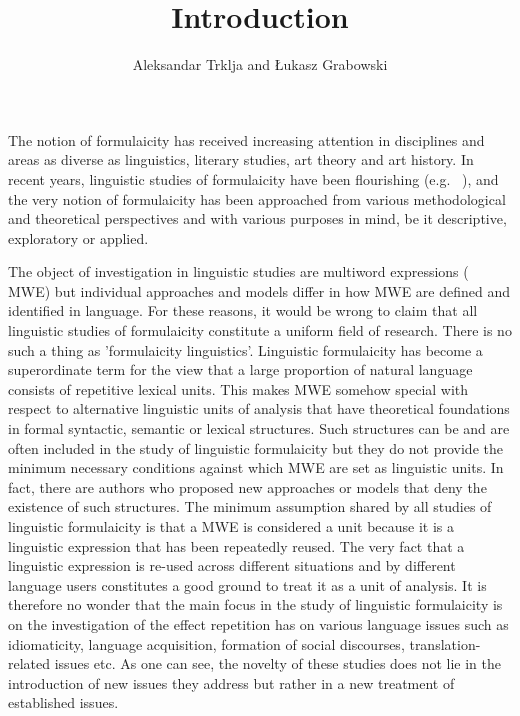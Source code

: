 \documentclass[output=paper]{langsci/langscibook}
\author{Aleksandar Trklja\orcid{}\affiliation{Universität Innsbruck} and Łukasz Grabowski\orcid{}\affiliation{University of Opole}}
\title{Introduction}
\begin{document}
\maketitle 

 



The notion of formulaicity has received increasing attention in disciplines and areas as diverse as  linguistics, literary studies, art theory and art history. In recent years, linguistic studies of formulaicity have been flourishing (e.g. ~\citealt{Wray2002,Wray2008,Wray2009,SchmittCarter2004,Wood2010a,Wood2010b,Wood2015,Kecskes2016,MylesCordier2017,PiirainenEtAl2020}), and the very notion of formulaicity has been approached from various methodological and theoretical perspectives and with various purposes in mind, be it descriptive, exploratory or applied.



The %
object of investigation in linguistic studies are multiword expressions (%
MWE) but individual approaches and models differ in how %
MWE are defined and identified in language. For these reasons, it would be wrong to claim that all linguistic studies of formulaicity constitute a uniform field of research. There is no such a thing as 'formulaicity linguistics'. Linguistic formulaicity has become a superordinate term for the view that a large proportion of natural language consists of repetitive lexical units. This makes %
MWE somehow special with respect to alternative linguistic units of analysis that have theoretical foundations in formal syntactic, semantic or lexical structures. Such structures can be and are often included in the study of linguistic formulaicity but they do not provide the minimum necessary conditions against which %
MWE are set as linguistic units. In fact, there are authors who proposed new approaches or models that deny the existence of such structures. The minimum assumption shared by all studies of linguistic formulaicity is that a MWE is considered a unit because it is a linguistic expression that has been repeatedly %
reused. The very fact that a linguistic expression is %
re-used across different situations and by different language users constitutes a good ground to treat it as a unit of analysis. It is therefore no wonder that the main focus in the study of linguistic formulaicity is on the investigation of the effect repetition has on various language issues such as idiomaticity, language acquisition, formation of social discourses, translation-related issues etc. As one can see, the novelty of these studies does not lie in the introduction of new issues they address but rather in a new treatment of established issues.
\end{document}
